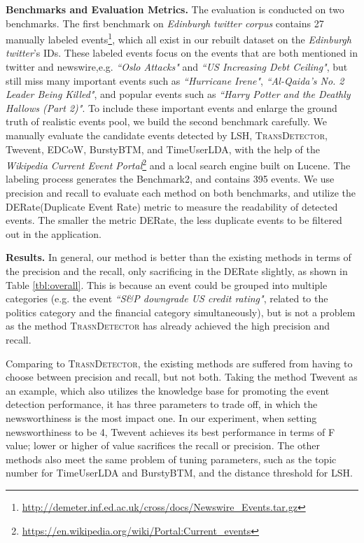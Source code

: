 \documentclass[runningheads,a4paper]{llncs}
\theoremstyle{exampstyle}
\begin{document}
\textbf{Benchmarks and Evaluation Metrics.} 
The evaluation is conducted on two benchmarks.
The first benchmark on \textit{Edinburgh twitter corpus} contains 27 manually labeled events\cite{petrovic2013can}\footnote{\url{http://demeter.inf.ed.ac.uk/cross/docs/Newswire_Events.tar.gz}}, which all exist in our rebuilt dataset on the \textit{Edinburgh twitter}'s IDs.
These labeled events focus on the events that are both mentioned in twitter and newswire,e.g. \textit{``Oslo Attacks"} and \textit{``US Increasing Debt Ceiling"}, but still miss many important events such as \textit{``Hurricane Irene"}, \textit{``Al-Qaida's No. 2 Leader Being Killed"}, and popular events such as \textit{``Harry Potter and the Deathly Hallows (Part 2)"}.
To include these important events and enlarge the ground truth of realistic events pool, we build the second benchmark carefully.
We manually evaluate the candidate events detected by LSH,  \textsc{TransDetector}, Twevent, EDCoW, BurstyBTM, and TimeUserLDA, with the help of the \textit{Wikipedia Current Event Portal}\footnote{\url{https://en.wikipedia.org/wiki/Portal:Current_events}} and a local search engine built on Lucene.
The labeling process generates the Benchmark2, and contains 395 events.
We use precision and recall to evaluate each method on both benchmarks, and utilize the DERate(Duplicate Event Rate) metric\cite{Twevent2012} to measure the readability of detected events.
The smaller the metric DERate, the less duplicate events to be filtered out in the application.


\textbf{Results.}
In general, our method is better than the existing methods in terms of the precision and the recall, only sacrificing in the DERate slightly, as shown in Table \ref{tbl:overall}. 
This is because an event could be grouped into multiple categories (e.g. the event \textit{``S\&P downgrade US credit rating"}, related to the politics category and the financial category simultaneously), but is not a problem as the method \textsc{TrasnDetector} has already achieved the high precision and recall. 

Comparing to \textsc{TrasnDetector}, the existing methods are suffered from having to choose between precision and recall, but not both. 
Taking the method Twevent as an example, which also utilizes the knowledge base for promoting the event detection performance, it has three parameters to trade off, in which the newsworthiness is the most impact one. 
In our experiment, when setting newsworthiness to be 4, Twevent achieves its best performance in terms of F value; lower or higher of value sacrifices the recall or precision. 
The other methods also meet the same problem of tuning parameters, such as the topic number for TimeUserLDA and BurstyBTM, and the distance threshold for LSH.
\end{document}
